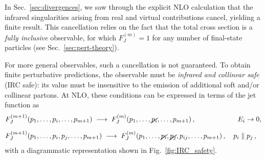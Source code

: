 In Sec.~\ref{sec:divergences}, we saw through the explicit NLO calculation
that the infrared singularities arising from
real and virtual contributions cancel, yielding a finite result. This
cancellation relies on the fact that the total cross section is a
\emph{fully inclusive} observable, for which $F_J^{(m)} = 1$ for any
number of final-state particles (see Sec.~\ref{sec:pert-theory}).

For more general observables, such a cancellation is not guaranteed.
To obtain finite perturbative predictions, the observable must be
\emph{infrared and collinear safe} (IRC safe): its value must be insensitive 
to the emission of additional soft and/or collinear partons.
At NLO, these conditions can be expressed in terms of the jet function as
\begin{equation}
\begin{aligned}
&F_J^{(m+1)}(p_1,\ldots,p_i,\ldots,p_{m+1})
\;\longrightarrow\;
F_J^{(m)}(p_1,\ldots,\cancel{p_i},\ldots,p_{m+1})\,,
\qquad\qquad\qquad E_i \to 0, \\[6pt]
&F_J^{(m+1)}(p_1,\ldots,p_i,p_j,\ldots,p_{m+1})
\;\longrightarrow\;
F_J^{(m)}(p_1,\ldots,\cancel{p_i},\cancel{p_j},p_{ij},\ldots,p_{m+1})\,,
\quad p_i \parallel p_j\,,
\end{aligned}
\label{eq:IRC-safety}
\end{equation}
with a diagrammatic representation shown in Fig.~\ref{fig:IRC_safety}. 

